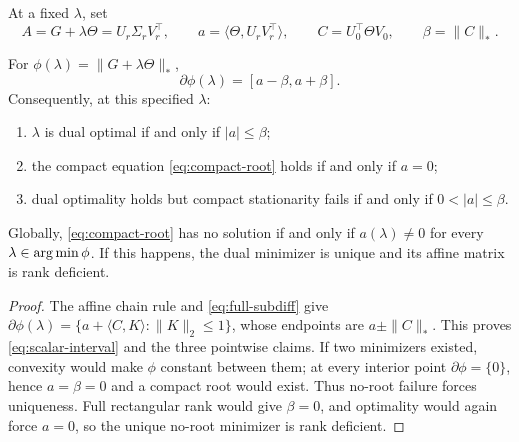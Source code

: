 At a fixed \(\lambda\), set
\begin{equation}
 A=G+\lambda\Theta=U_r\Sigma_rV_r^\top,
 \qquad
 a=\langle\Theta,U_rV_r^\top\rangle,
 \qquad
 C=U_0^\top\Theta V_0,
 \qquad
 \beta=\|C\|_*.
 \label{eq:a-C-beta-main}
\end{equation}

\begin{theorem}
\label{thm:interval}
For \(\phi(\lambda)=\|G+\lambda\Theta\|_*\),
\begin{equation}
 \partial\phi(\lambda)=[a-\beta,a+\beta].
 \label{eq:scalar-interval}
\end{equation}
Consequently, at this specified \(\lambda\):
\begin{enumerate}
 \item \(\lambda\) is dual optimal if and only if \(|a|\le\beta\);
 \item the compact equation \eqref{eq:compact-root} holds if and only if
 \(a=0\);
 \item dual optimality holds but compact stationarity fails if and only if
 \(0<|a|\le\beta\).
\end{enumerate}
Globally, \eqref{eq:compact-root} has no solution if and only if
\(a(\lambda)\ne0\) for every \(\lambda\in\operatorname*{arg\,min}\phi\).  If this happens,
the dual minimizer is unique and its affine matrix is rank deficient.
\end{theorem}

\begin{proof}
The affine chain rule and \eqref{eq:full-subdiff} give
\(\partial\phi(\lambda)=\{a+\langle C,K\rangle:\|K\|_2\le1\}\), whose
endpoints are \(a\pm\|C\|_*\).  This proves
\eqref{eq:scalar-interval} and the three pointwise claims.  If two minimizers
existed, convexity would make \(\phi\) constant between them; at every
interior point \(\partial\phi=\{0\}\), hence \(a=\beta=0\) and a compact root
would exist.  Thus no-root failure forces uniqueness.  Full rectangular rank
would give \(\beta=0\), and optimality would again force \(a=0\), so the
unique no-root minimizer is rank deficient.
\end{proof}

